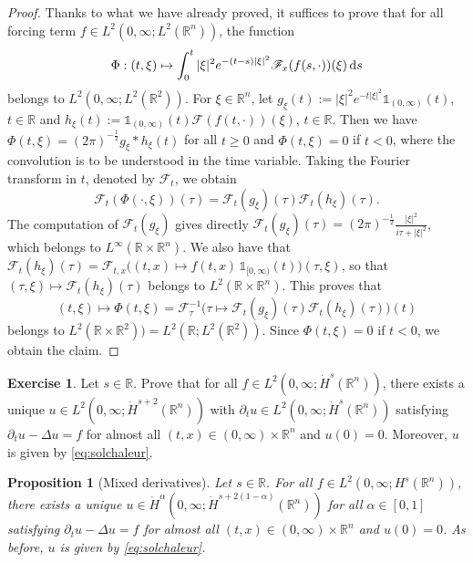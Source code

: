 \documentclass[a4paper, 12pt]{article}
\theoremstyle{plain}
\newtheorem{proposition}{Proposition}[section]
\theoremstyle{definition}
\newtheorem{exercise}{Exercise}
\theoremstyle{remark}
\numberwithin{equation}{section}
\begin{document}
\begin{proof}
Thanks to what we have already proved, it suffices to prove that for all forcing term $f\in L^2(0,\infty; L^2({\mathds{R}}^n))$, 
the function
\[
\Phi:(t,\xi)\mapsto \int_0^t |\xi|^2 e^{-(t-s)|\xi|^2}{\mathscr{F}}_x(f(s,\cdot))(\xi)\,{\rm d}s
\]
belongs to $L^2(0,\infty;L^2({\mathds{R}}^2))$. For $\xi\in{\mathds{R}}^n$, let $g_{\xi}(t):= |\xi|^2e^{-t|\xi|^2} \mathds{1}_{(0,\infty)}(t)$,
$t\in{\mathds{R}}$ and $h_{\xi}(t):=\mathds{1}_{(0,\infty)}(t){\mathscr{F}}(f(t,\cdot))(\xi)$, $t\in{\mathds{R}}$.
Then we have $\Phi(t,\xi)=(2\pi)^{-\frac{1}{2}}g_{\xi}*h_{\xi}(t)$ for all $t\ge 0$ and $\Phi(t,\xi)=0$ if $t<0$, where the convolution is to 
be understood in the time variable. Taking the Fourier transform in $t$, denoted by ${\mathscr{F}}_t$, we obtain
\[
{\mathscr{F}}_t(\Phi(\cdot,\xi))(\tau) = {\mathscr{F}}_t(g_{\xi})(\tau){\mathscr{F}}_t(h_{\xi})(\tau).
\]
The computation of ${\mathscr{F}}_t(g_{\xi})$ gives directly ${\mathscr{F}}_t(g_{\xi})(\tau)=(2\pi)^{-\frac{1}{2}}\frac{|\xi|^2}{i\tau+|\xi|^2}$, which 
belongs to $L^\infty({\mathds{R}}\times{\mathds{R}}^n)$.
We also have that ${\mathscr{F}}_t(h_{\xi})(\tau)={\mathscr{F}}_{t,x}\bigl((t,x)\mapsto f(t,x)\,{\mathds{1}}_{[0,\infty)}(t)\bigr)(\tau,\xi)$, so that 
$(\tau,\xi)\mapsto {\mathscr{F}}_t(h_{\xi})(\tau)$ belongs to $L^2({\mathds{R}}\times{\mathds{R}}^n)$. This proves that 
\[
(t,\xi)\mapsto \Phi (t,\xi)={\mathscr{F}}_{\tau}^{-1}\bigl(\tau\mapsto{\mathscr{F}}_t(g_{\xi})(\tau){\mathscr{F}}_t(h_{\xi})(\tau)\bigr)(t)
\]
belongs to $L^2({\mathds{R}}\times{\mathds{R}}^2))=L^2({\mathds{R}};L^2({\mathds{R}}^2))$. Since $\Phi(t,\xi)=0$ if $t<0$, we obtain 
the claim.
\end{proof}

\begin{exercise}
Let $s\in {\mathds{R}}$. Prove that
for all $f\in L^2(0,\infty; \dot H^s({\mathds{R}}^n))$, there exists a unique $u\in L^2(0,\infty; \dot H^{s+2}({\mathds{R}}^n))$ with
$\partial_t u\in L^2(0,\infty; \dot H^s({\mathds{R}}^n))$ satisfying $\partial_t u-\Delta u=f$ for almost all $(t,x)\in (0,\infty)\times{\mathds{R}}^n$
and $u(0)=0$. Moreover, $u$ is given by \eqref{eq:solchaleur}.
\end{exercise}

\begin{proposition}[Mixed derivatives]
\label{prop:mixedMaxReg}
Let $s\in{\mathds{R}}$.
For all $f\in L^2(0,\infty; H^s({\mathds{R}}^n))$, there exists a unique $u\in \dot H^{\alpha}(0,\infty ;\dot H^{s+2(1-\alpha)}({\mathds{R}}^n))$ 
for all $\alpha\in [0,1]$ satisfying $\partial_t u-\Delta u=f$ 
for almost all $(t,x)\in (0,\infty)\times{\mathds{R}}^n$
and $u(0)=0$. As before, $u$ is given by \eqref{eq:solchaleur}.
\end{proposition}
\end{document}
